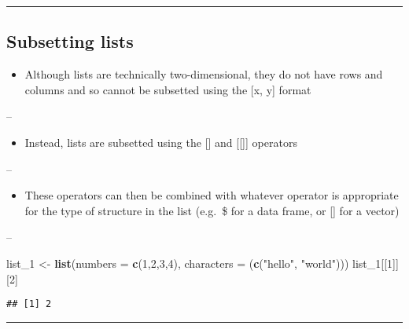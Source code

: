 \documentclass[]{article}
\newenvironment{Shaded}{\begin{snugshade}}{\end{snugshade}}
\newcommand{\DataTypeTok}[1]{\textcolor[rgb]{0.13,0.29,0.53}{#1}}
\newcommand{\DecValTok}[1]{\textcolor[rgb]{0.00,0.00,0.81}{#1}}
\newcommand{\KeywordTok}[1]{\textcolor[rgb]{0.13,0.29,0.53}{\textbf{#1}}}
\newcommand{\NormalTok}[1]{#1}
\newcommand{\StringTok}[1]{\textcolor[rgb]{0.31,0.60,0.02}{#1}}
\providecommand{\tightlist}{%
  \setlength{\itemsep}{0pt}\setlength{\parskip}{0pt}}
\begin{document}
\begin{center}\rule{0.5\linewidth}{\linethickness}\end{center}

\hypertarget{subsetting-lists-1}{%
\subsection{Subsetting lists}\label{subsetting-lists-1}}

\begin{itemize}
\tightlist
\item
  Although lists are technically two-dimensional, they do not have rows
  and columns and so cannot be subsetted using the {[}x, y{]} format
\end{itemize}

--

\begin{itemize}
\tightlist
\item
  Instead, lists are subsetted using the {[}{]} and {[}{[}{]}{]}
  operators
\end{itemize}

--

\begin{itemize}
\tightlist
\item
  These operators can then be combined with whatever operator is
  appropriate for the type of structure in the list (e.g.~\$ for a data
  frame, or {[}{]} for a vector)
\end{itemize}

--

\begin{Shaded}
\begin{Highlighting}[]
\NormalTok{list_}\DecValTok{1}\NormalTok{ <-}\StringTok{ }\KeywordTok{list}\NormalTok{(}\DataTypeTok{numbers =} \KeywordTok{c}\NormalTok{(}\DecValTok{1}\NormalTok{,}\DecValTok{2}\NormalTok{,}\DecValTok{3}\NormalTok{,}\DecValTok{4}\NormalTok{), }\DataTypeTok{characters =}\NormalTok{ (}\KeywordTok{c}\NormalTok{(}\StringTok{"hello"}\NormalTok{, }\StringTok{"world"}\NormalTok{)))}
\NormalTok{list_}\DecValTok{1}\NormalTok{[[}\DecValTok{1}\NormalTok{]][}\DecValTok{2}\NormalTok{]}
\end{Highlighting}
\end{Shaded}

\begin{verbatim}
## [1] 2
\end{verbatim}

\begin{center}\rule{0.5\linewidth}{\linethickness}\end{center}
\end{document}
